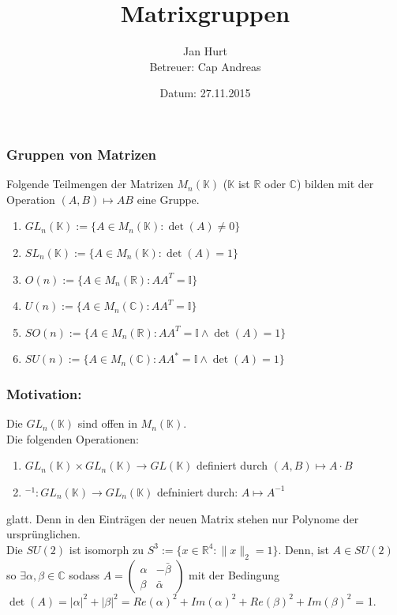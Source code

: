 \documentclass[11pt]{beamer}
\title{Matrixgruppen}
\author{Jan Hurt\\
		Betreuer: Cap Andreas}
\date{\small{Datum: 27.11.2015}}
\begin{document}
\begin{frame}
\titlepage
\end{frame}

\begin{frame}
	\frametitle{Gruppen von Matrizen}
	Folgende Teilmengen der Matrizen $M_n(\mathbb{K})$
	($\mathbb{K}$ ist $\mathbb{R}$ oder $\mathbb{C}$) bilden mit der Operation
	$(A,B) \mapsto AB$ eine Gruppe. \pause
	\begin{enumerate}[label = $(\roman*)$]
	\item $GL_n(\mathbb{K}) := \{A \in M_n(\mathbb{K}): \det(A) \neq 0 \}$ \\[0.5em] \pause

	\item $SL_n(\mathbb{K}) := \{A \in M_n(\mathbb{K}): \det(A) = 1 \}$ \\[0.5em]

	\item $O(n) := \{A \in M_n(\mathbb{R}): AA^T = \mathbb{I} \}$ \\[0.5em]

	\item $U(n) := \{A \in M_n(\mathbb{C}): AA^T = \mathbb{I} \}$ \\[0.5em]

	\item $SO(n) := \{A \in M_n(\mathbb{R}): AA^T = \mathbb{I} \wedge \det(A) = 1  \}$ \\[0.5em]

	\item $SU(n) := \{A \in M_n(\mathbb{C}): AA^* = \mathbb{I} \wedge \det(A) = 1 \}$ \\[0.5em]
	\end{enumerate}
\end{frame}

\begin{frame}
	\frametitle{Motivation:}
	Die $GL_n(\mathbb{K})$ sind offen in $M_n(\mathbb K)$. \\ [1em] \pause
	Die folgenden Operationen:
	\begin{enumerate}[label = $(\roman*)$]
		\item $GL_n(\mathbb{K}) \times GL_n(\mathbb{K}) \to GL(\mathbb K)$ definiert durch $(A,B) \mapsto A\cdot B$ \pause

		\item $^{-1}:GL_n(\mathbb{K}) \rightarrow GL_n(\mathbb{K})$ defniniert durch: $A\mapsto A^{-1}$
	\end{enumerate}
	glatt. \pause
	Denn in den Einträgen der neuen Matrix stehen nur Polynome der
	ursprünglichen. \\[1em] \pause
	Die $SU(2)$ ist isomorph zu $S^3 :=\{ x \in \mathbb{R}^4: \|x\|_2 = 1\}$. \pause
	Denn, ist $A \in SU(2)$ so
	$\exists \alpha, \beta \in \mathbb{C}$ sodass
	$A = \left( \begin{matrix} \alpha & -\bar{\beta} \\ \beta  & \bar{\alpha}\end{matrix} \right)$
	mit der Bedingung $\det(A) = |\alpha|^2 + |\beta|^2 =
	Re(\alpha)^2 + Im(\alpha)^2 + Re(\beta)^2 + Im(\beta)^2$ = 1. \\[1em]
\end{frame}
\end{document}
